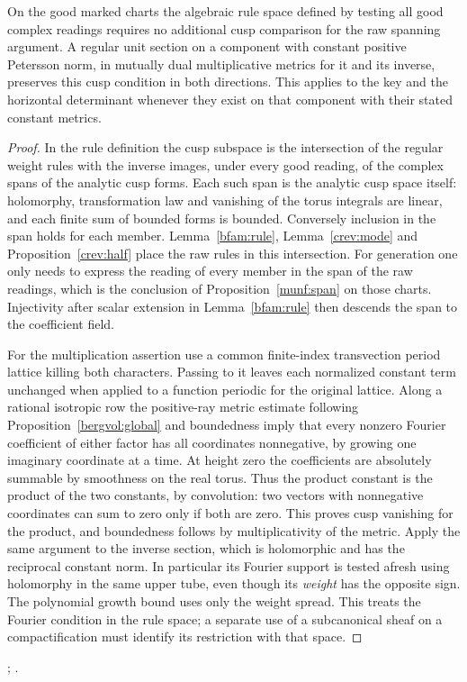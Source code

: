 \begin{corollary}\label{crev:twist}
On the good marked charts the algebraic rule space defined by
testing all good complex readings requires no additional cusp
comparison for the raw spanning argument. A regular unit section on
a component with constant positive Petersson norm, in mutually dual
multiplicative metrics for it and its inverse, preserves this cusp
condition in both directions. This applies to the key and the
horizontal determinant whenever they exist on that component with
their stated constant metrics.
\end{corollary}
\begin{proof}
In the rule definition the cusp subspace is the intersection of
the regular weight rules with the inverse images, under every good
reading, of the complex spans of the analytic cusp forms. Each such
span is the analytic cusp space itself: holomorphy, transformation
law and vanishing of the torus integrals are linear, and each
finite sum of bounded forms is bounded. Conversely inclusion in the
span holds for each member. Lemma~\ref{bfam:rule},
Lemma~\ref{crev:mode} and Proposition~\ref{crev:half} place the
raw rules in this intersection. For generation one only needs to
express the reading of every member in the span of the raw readings,
which is the conclusion of Proposition~\ref{munf:span} on those
charts. Injectivity after scalar extension in Lemma~\ref{bfam:rule}
then descends the span to the coefficient field.

For the multiplication assertion use a common finite-index
transvection period lattice killing both characters. Passing to
it leaves each normalized constant term unchanged when applied to
a function periodic for the original lattice. Along a rational
isotropic row the positive-ray metric estimate following
Proposition~\ref{bergvol:global} and boundedness imply that
every nonzero Fourier coefficient of either factor has all
coordinates nonnegative, by growing one imaginary coordinate
at a time. At height zero the coefficients are absolutely summable
by smoothness on the real torus. Thus the product constant is the
product of the two constants, by convolution: two vectors with
nonnegative coordinates can sum to zero only if both are zero.
This proves cusp vanishing for the product, and boundedness follows
by multiplicativity of the metric. Apply the same argument to the
inverse section, which is holomorphic and has the reciprocal
constant norm. In particular its Fourier support is tested afresh
using holomorphy in the same upper tube, even though its \emph{weight}
has the opposite sign. The polynomial growth bound uses only the
weight spread. This treats the Fourier condition in the rule space;
a separate use of a subcanonical sheaf on a compactification must
identify its restriction with that space.
\end{proof}
;
.

